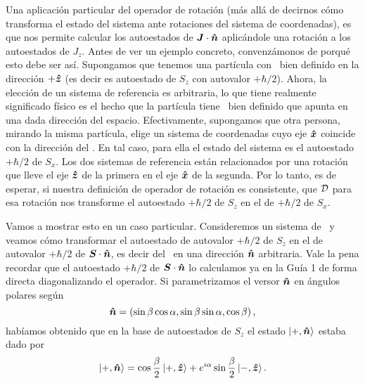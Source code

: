 \documentclass[10pt, a4paper]{article}
\numberwithin{equation}{subsection}
\begin{document}
Una aplicación particular del operador de rotación (más allá de decirnos cómo
transforma el estado del sistema ante rotaciones del sistema de coordenadas),
es que nos permite calcular los autoestados de $\vb*{J}\cdot\vu*{n}$
aplicándole una rotación a los autoestados de $J_z$. Antes de ver un ejemplo
concreto, convenzámonos de porqué esto debe ser así. Supongamos que tenemos
una partícula con \spinhalf~bien definido en la dirección $+\vu*{z}$ (es decir
es autoestado de $S_z$ con autovalor $+\hbar/2$). Ahora, la elección de un
sistema de referencia es arbitraria, lo que tiene realmente significado físico
es el hecho que la partícula tiene \spin~bien definido que apunta en una dada
dirección del espacio. Efectivamente, supongamos que otra persona, mirando la
misma partícula, elige un sistema de coordenadas cuyo eje $\vu*{x}$ coincide
con la dirección del \spin. En tal caso, para ella el estado del sistema es el
autoestado $+\hbar/2$ de $S_x$. Los dos sistemas de referencia están
relacionados por una rotación que lleve el eje $\vu*{z}$ de la primera en el
eje $\vu*{x}$ de la segunda. Por lo tanto, es de esperar, si nuestra
definición de operador de rotación es consistente, que $\RotationOp$ para esa
rotación nos transforme el autoestado $+\hbar/2$ de $S_z$ en el de $+\hbar/2$
de $S_x$.

Vamos a mostrar esto en un caso particular. Consideremos un sistema de
\spinhalf~y veamos cómo transformar el autoestado de autovalor $+\hbar/2$ de
$S_z$ en el de autovalor $+\hbar/2$ de $\vb*{S}\cdot\vu*{n}$, es decir del
\spin~en una dirección $\vu*{n}$ arbitraria. Vale la pena recordar que el
autoestado $+\hbar/2$ de $\vb*{S}\cdot\vu*{n}$ lo calculamos ya en la Guía 1
de forma directa diagonalizando el operador. Si parametrizamos el versor
$\vu*{n}$ en ángulos polares según
\begin{equation}
  \vu*{n} = \left(\sin\beta\cos\alpha, \sin\beta\sin\alpha, \cos\beta\right),
\end{equation}
habíamos obtenido que en la base de autoestados de $S_z$ el estado
$\ket{+,\vu*{n}}$ estaba dado por
\begin{equation}
  \ket{+,\vu*{n}} = \cos\frac{\beta}{2}\ket{+,\vu*{z}} +
    e^{i\alpha} \sin\frac{\beta}{2}\ket{-,\vu*{z}}.
\end{equation}
\end{document}
